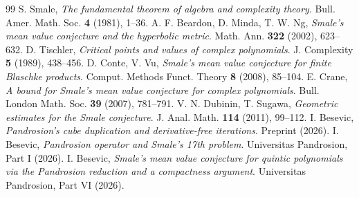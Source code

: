 \documentclass[11pt,a4paper]{article}
\begin{document}
\begin{thebibliography}{99}
 S. Smale, \textit{The fundamental theorem of algebra and complexity theory}. Bull. Amer. Math. Soc. \textbf{4} (1981), 1--36.
 A. F. Beardon, D. Minda, T. W. Ng, \textit{Smale's mean value conjecture and the hyperbolic metric}. Math. Ann. \textbf{322} (2002), 623--632.
 D. Tischler, \textit{Critical points and values of complex polynomials}. J. Complexity \textbf{5} (1989), 438--456.
 D. Conte, V. Vu, \textit{Smale's mean value conjecture for finite Blaschke products}. Comput. Methods Funct. Theory \textbf{8} (2008), 85--104.
 E. Crane, \textit{A bound for Smale's mean value conjecture for complex polynomials}. Bull. London Math. Soc. \textbf{39} (2007), 781--791.
 V. N. Dubinin, T. Sugawa, \textit{Geometric estimates for the Smale conjecture}. J. Anal. Math. \textbf{114} (2011), 99--112.
 I. Besevic, \textit{Pandrosion's cube duplication and derivative-free iterations}. Preprint (2026).
 I. Besevic, \textit{Pandrosion operator and Smale's 17th problem}. Universitas Pandrosion, Part I (2026).
 I. Besevic, \textit{Smale's mean value conjecture for quintic polynomials via the Pandrosion reduction and a compactness argument}. Universitas Pandrosion, Part VI (2026).
\end{thebibliography}
\end{document}
